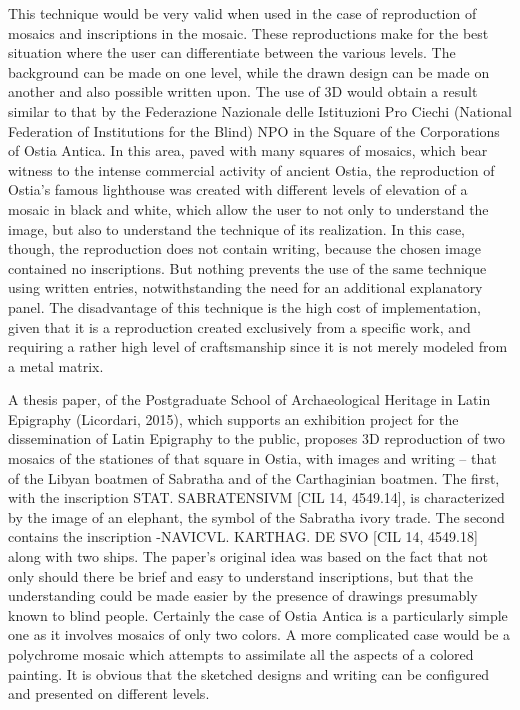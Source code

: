 \documentclass[amsthm,ebook]{saparticle}
\begin{document}
This technique would be very valid when used in the case of reproduction of mosaics and inscriptions in the mosaic.
These reproductions make for the best situation where the user can differentiate between the various levels. The
background can be made on one level, while the drawn design can be made on another and also possible written upon. The
use of 3D would obtain a result similar to that by the Federazione Nazionale delle Istituzioni Pro Ciechi (National
Federation of Institutions for the Blind) NPO in the Square of the Corporations of Ostia Antica. In this area, paved
with many squares of mosaics, which bear witness to the intense commercial activity of ancient Ostia, the reproduction
of Ostia’s famous lighthouse was created with different levels of elevation of a mosaic in black and white, which allow
the user to not only to understand the image, but also to understand the technique of its realization. In this case,
though, the reproduction does not contain writing, because the chosen image contained no inscriptions. But nothing
prevents the use of the same technique using written entries, notwithstanding the need for an additional explanatory
panel. The disadvantage of this technique is the high cost of implementation, given that it is a reproduction created
exclusively from a specific work, and requiring a rather high level of craftsmanship since it is not merely modeled
from a metal matrix.

A thesis paper, of the Postgraduate School of Archaeological Heritage in Latin Epigraphy (Licordari, 2015), which
supports an exhibition project for the dissemination of Latin Epigraphy to the public, proposes 3D reproduction of two
mosaics of the stationes of that square in Ostia, with images and writing – that of the Libyan boatmen of Sabratha and
of the Carthaginian boatmen. The first, with the inscription STAT. SABRATENSIVM [CIL 14, 4549.14], is characterized by
the image of an elephant, the symbol of the Sabratha ivory trade. The second contains the inscription -NAVICVL.
KARTHAG. DE SVO [CIL 14, 4549.18] along with two ships. The paper’s original idea was based on the fact that not only
should there be brief and easy to understand inscriptions, but that the understanding could be made easier by the
presence of drawings presumably known to blind people. Certainly the case of Ostia Antica is a particularly simple one
as it involves mosaics of only two colors. A more complicated case would be a polychrome mosaic which attempts to
assimilate all the aspects of a colored painting. It is obvious that the sketched designs and writing can be configured
and presented on different levels.
\end{document}
